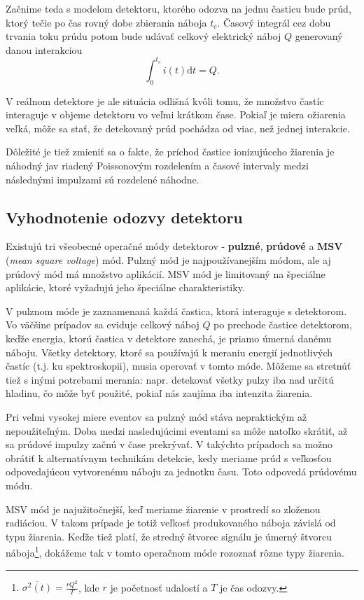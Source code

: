 \documentclass[../../main.tex]{subfiles}
\begin{document}
Začnime teda s modelom detektoru, ktorého odozva na jednu časticu bude prúd, ktorý tečie po čas rovný dobe zbierania náboja $t_c$. Časový integrál cez dobu trvania toku prúdu potom bude udávať celkový elektrický náboj $Q$ generovaný danou interakciou
\begin{equation}
\int_0^{t_c}i(t)\mathrm{d}t=Q.
\end{equation}

V reálnom detektore je ale situácia odlišná kvôli tomu, že množstvo častíc interaguje v objeme detektoru vo veľmi krátkom čase. Pokiaľ je miera ožiarenia veľká, môže sa stať, že detekovaný prúd pochádza od viac, než jednej interakcie.

Dôležité je tiež zmieniť sa o fakte, že príchod častice ionizujúceho žiarenia je náhodný jav riadený Poissonovým rozdelením a časové intervaly medzi následnými impulzami sú rozdelené náhodne.

\subsection{Vyhodnotenie odozvy detektoru}

Existujú tri všeobecné operačné módy detektorov - \textbf{pulzné}, \textbf{prúdové} a \textbf{MSV} (\textit{mean square voltage}) mód. Pulzný mód je najpoužívanejším módom, ale aj prúdový mód má množstvo aplikácií. MSV mód je limitovaný na špeciálne aplikácie, ktoré vyžadujú jeho špeciálne charakteristiky. 

V pulznom móde je zaznamenaná každá častica, ktorá interaguje s detektorom. Vo väčšine prípadov sa eviduje celkový náboj $Q$ po prechode častice detektorom, keďže energia, ktorú častica v detektore zanechá, je priamo úmerná danému náboju. Všetky detektory, ktoré sa používajú k meraniu energií jednotlivých častíc (t.j. ku spektroskopii), musia operovať v tomto móde. Môžeme sa stretnúť tiež s inými potrebami merania: napr. detekovať všetky pulzy iba nad určitú hladinu, čo môže byť použité, pokiaľ nás zaujíma iba intenzita žiarenia.

Pri veľmi vysokej miere eventov sa pulzný mód stáva nepraktickým až nepoužiteľným. Doba medzi nasledujúcimi eventami sa môže natoľko skrátiť, až sa prúdové impulzy začnú v čase prekrývať. V takýchto prípadoch sa možno obrátiť k alternatívnym technikám detekcie, kedy meriame prúd s veľkosťou odpovedajúcou vytvorenému náboju za jednotku času. Toto odpovedá prúdovému módu.

MSV mód je najužitočnejší, keď meriame žiarenie v prostredí so zloženou radiáciou. V takom prípade je totiž veľkosť produkovaného náboja závislá od typu žiarenia. Keďže tiež platí, že stredný štvorec signálu je úmerný štvorcu náboja\footnote{$\overline{\sigma^2 (t)}=\frac{rQ^2}{T}$, kde $r$ je početnosť udalostí a $T$ je čas odozvy.}, dokážeme tak v tomto operačnom móde rozoznať rôzne typy žiarenia.
\end{document}
